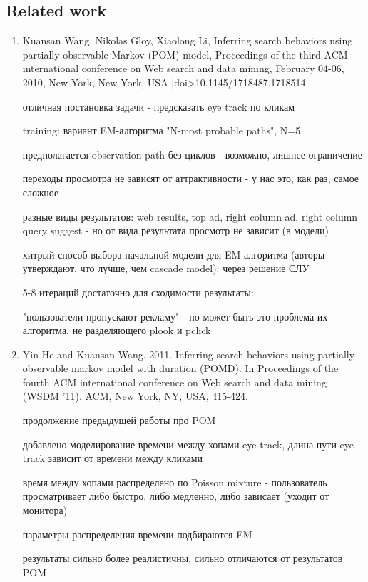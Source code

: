 \documentclass[12pt,a4paper]{article}
\begin{document}
\subsection{Related work}

\begin{enumerate}

\item Kuansan Wang, Nikolas Gloy, Xiaolong Li, Inferring search behaviors using partially observable Markov (POM) model, Proceedings of the third ACM international conference on Web search and data mining, February 04-06, 2010, New York, New York, USA  [doi>10.1145/1718487.1718514]

  отличная постановка задачи - предсказать eye track по кликам

  training: вариант EM-алгоритма "N-most probable paths", N=5

    предполагается observation path без циклов - возможно, лишнее ограничение

	переходы просмотра не зависят от аттрактивности - у нас это, как раз, самое сложное

	разные виды результатов: web results, top ad, right column ad, right column query suggest - но от вида результата просмотр не зависит (в модели)

    хитрый способ выбора начальной модели для EM-алгоритма (авторы утверждают, что лучше, чем cascade model): через решение СЛУ

	5-8 итераций достаточно для сходимости
  результаты:

    "пользователи пропускают рекламу" - но может быть это проблема их алгоритма, не разделяющего plook и pclick

\item Yin He and Kuansan Wang. 2011. Inferring search behaviors using partially observable markov model with duration (POMD). In Proceedings of the fourth ACM international conference on Web search and data mining (WSDM '11). ACM, New York, NY, USA, 415-424.

  продолжение предыдущей работы про POM

  добавлено моделирование времени между хопами eye track, длина пути eye track зависит от времени между кликами

  время между хопами распределено по Poisson mixture - пользователь просматривает либо быстро, либо медленно, либо зависает (уходит от монитора)

  параметры распределения времени подбираются EM

  результаты сильно более реалистичны, сильно отличаются от результатов POM


\end{enumerate}
\end{document}
